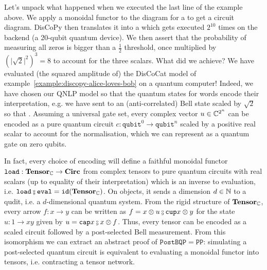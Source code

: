 Let's unpack what happened when we executed the last line of the example above.
We apply a monoidal functor  to the diagram for a  to get a circuit diagram.
DisCoPy then translates it into a  which gets executed $2^{10}$ times on the  backend (a 20-qubit quantum device).
We then assert that the probability of measuring all zeros is bigger than a $\frac{1}{2}$ threshold, once multiplied by $(\vert \sqrt{2} \vert^2)^3 = 8$ to account for the three scalars.
What did we achieve?
We have evaluated (the squared amplitude of) the DisCoCat model of example~\ref{example:discopy-alice-loves-bob} on a quantum computer!
Indeed, we have chosen our QNLP model so that the quantum states for words encode their interpretation, e.g. we have sent  to an (anti-correlated) Bell state scaled by $\sqrt{2}$ so that  \py{= [[0, 1], [1, 0]]}.
Assuming a universal gate set, every complex vector $u \in \mathbb{C}^{2^n}$ can be encoded as a pure quantum circuit $c : \mathtt{qubit}^0 \to \mathtt{qubit}^n$ scaled by a positive real scalar to account for the normalisation, which we can represent as a quantum gate on zero qubits.

In fact, every choice of encoding will define a faithful monoidal functor $\mathtt{load} : \mathbf{Tensor}_{\mathbb{C}} \to \mathbf{Circ}$ from complex tensors to pure quantum circuits with real scalars (up to equality of their interpretation) which is an inverse to evaluation, i.e. $\mathtt{load} \fcmp \mathtt{eval} = \id(\mathbf{Tensor}_\C)$.
On objects, it sends a dimension $d \in \mathbb{N}$ to a qudit, i.e. a $d$-dimensional quantum system.
From the rigid structure of $\mathbf{Tensor}_{\mathbb{C}}$, every arrow $f : x \to y$ can be written as $f = x \otimes u \fcmp \ttcup{x} \otimes y$ for the state $u : 1 \to x y$ given by $u = \ttcap{x} \fcmp x \otimes f$.
Thus, every tensor can be encoded as a scaled circuit followed by a post-selected Bell measurement.
From this isomorphism we can extract an abstract proof of $\mathtt{PostBQP} = \mathtt{PP}$: simulating a post-selected quantum circuit is equivalent to evaluating a monoidal functor into tensors, i.e. contracting a tensor network.

